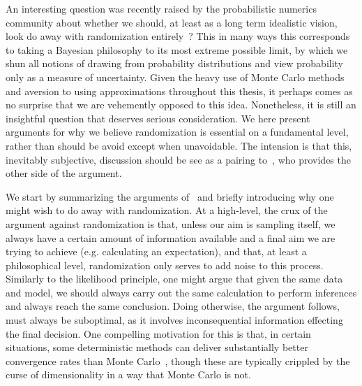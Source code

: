 An interesting question was recently raised by the probabilistic numerics~\citep{hennig2015probabilistic}
community about whether we should, at least as a long term idealistic vision, look do away with randomization entirely~\citep{schober2017thesis}?  
This in many ways this corresponds to taking a Bayesian philosophy to its most extreme possible
limit, by which we shun all notions of drawing from probability distributions and view probability only as a measure
of uncertainty.  Given the heavy use of Monte Carlo methods and aversion to using approximations throughout this thesis,
it perhaps comes as no surprise that we are vehemently opposed to this idea.  Nonetheless, it is still an insightful
question that deserves serious consideration.  We here present arguments for why we believe randomization is essential
on a fundamental level, rather than should be avoid except when unavoidable.  The intension is that this, inevitably subjective,
discussion should be see as a pairing to~\citep{schober2017thesis}, who provides the other side of the argument.

We start by summarizing the arguments of~\citep{schober2017thesis} and briefly introducing why one might wish to
do away with randomization.  At a high-level, the crux of the argument against randomization is that, unless our aim 
is sampling itself, we always have a certain amount of information available and a final aim we are trying to achieve (e.g.
calculating an expectation), and that, at least a philosophical level, randomization only serves to add noise to this
process.  
Similarly to the likelihood principle, one might argue that given the same data and model, we should 
always carry out the same calculation to perform inferences and always reach the same conclusion.  Doing otherwise,
the argument follows, must always be suboptimal, as it involves inconsequential information effecting the final
decision.  One compelling motivation for this is that, in certain situations, some deterministic
methods can deliver substantially better convergence rates than Monte Carlo~\citep{briol2016fwbq,caflisch1998monte}, 
though these are typically crippled by the curse of dimensionality in a way that Monte Carlo is not.

